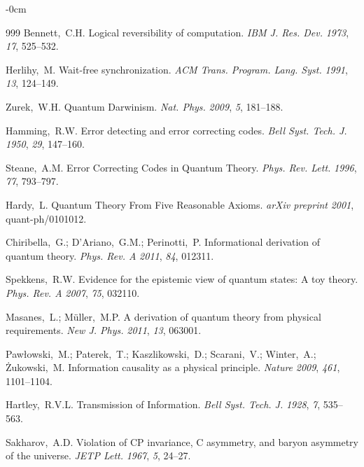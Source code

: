 \documentclass[entropy,article,submit,pdftex,oneauthor]{Definitions/mdpi}
\begin{document}
\begin{adjustwidth}{-\extralength}{0cm}
\begin{thebibliography}{999}
Bennett,~C.H. Logical reversibility of computation. \textit{IBM J. Res. Dev.} \emph{1973}, \textit{17}, 525--532.

Herlihy,~M. Wait-free synchronization. \textit{ACM Trans. Program. Lang. Syst.} \emph{1991}, \textit{13}, 124--149.

Zurek,~W.H. Quantum Darwinism. \textit{Nat. Phys.} \emph{2009}, \textit{5}, 181--188.

Hamming,~R.W. Error detecting and error correcting codes. \textit{Bell Syst. Tech. J.} \emph{1950}, \textit{29}, 147--160.

Steane,~A.M. Error Correcting Codes in Quantum Theory. \textit{Phys. Rev. Lett.} \emph{1996}, \textit{77}, 793--797.

Hardy,~L. Quantum Theory From Five Reasonable Axioms. \textit{arXiv preprint} \emph{2001}, quant-ph/0101012.

Chiribella,~G.; D'Ariano,~G.M.; Perinotti,~P. Informational derivation of quantum theory. \textit{Phys. Rev. A} \emph{2011}, \textit{84}, 012311.

Spekkens,~R.W. Evidence for the epistemic view of quantum states: A toy theory. \textit{Phys. Rev. A} \emph{2007}, \textit{75}, 032110.

Masanes,~L.; M\"uller,~M.P. A derivation of quantum theory from physical requirements. \textit{New J. Phys.} \emph{2011}, \textit{13}, 063001.

Paw\l owski,~M.; Paterek,~T.; Kaszlikowski,~D.; Scarani,~V.; Winter,~A.; \.Zukowski,~M. Information causality as a physical principle. \textit{Nature} \emph{2009}, \textit{461}, 1101--1104.

Hartley,~R.V.L. Transmission of Information. \textit{Bell Syst. Tech. J.} \emph{1928}, \textit{7}, 535--563.

Sakharov,~A.D. Violation of CP invariance, C asymmetry, and baryon asymmetry of the universe. \textit{JETP Lett.} \emph{1967}, \textit{5}, 24--27.

\end{thebibliography}

\end{adjustwidth}
\end{document}
